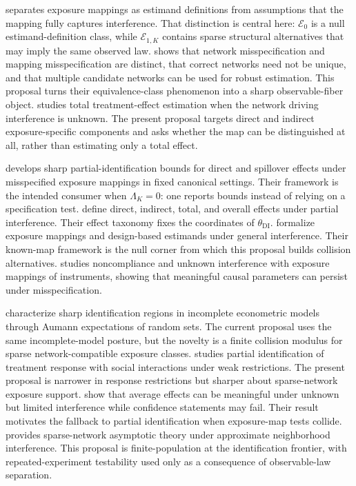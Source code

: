 \documentclass[11pt]{article}
\theoremstyle{definition}
\theoremstyle{plain}
\theoremstyle{remark}
\begin{document}
\citet{Savje2024} separates exposure mappings as estimand definitions from assumptions that the mapping fully captures interference.  That distinction is central here: \(\mathcal E_0\) is a null estimand-definition class, while \(\mathcal E_{1,K}\) contains sparse structural alternatives that may imply the same observed law.
\citet{WeinsteinNevo2026} shows that network misspecification and mapping misspecification are distinct, that correct networks need not be unique, and that multiple candidate networks can be used for robust estimation.  This proposal turns their equivalence-class phenomenon into a sharp observable-fiber object.
\citet{YuAiroldiBorgsChayes2022} studies total treatment-effect estimation when the network driving interference is unknown.  The present proposal targets direct and indirect exposure-specific components and asks whether the map can be distinguished at all, rather than estimating only a total effect.

\citet{SchroderOprescuFeuerriegelKallus2026} develops sharp partial-identification bounds for direct and spillover effects under misspecified exposure mappings in fixed canonical settings.  Their framework is the intended consumer when \(\Lambda_K=0\): one reports bounds instead of relying on a specification test.
\citet{HudgensHalloran2008} define direct, indirect, total, and overall effects under partial interference.  Their effect taxonomy fixes the coordinates of \(\theta_{\mathrm{DI}}\).
\citet{AronowSamii2017} formalize exposure mappings and design-based estimands under general interference.  Their known-map framework is the null corner from which this proposal builds collision alternatives.
\citet{HoshinoYanagi2024} studies noncompliance and unknown interference with exposure mappings of instruments, showing that meaningful causal parameters can persist under misspecification.

\citet{BeresteanuMolchanovMolinari2011} characterize sharp identification regions in incomplete econometric models through Aumann expectations of random sets.  The current proposal uses the same incomplete-model posture, but the novelty is a finite collision modulus for sparse network-compatible exposure classes.
\citet{Manski2013} studies partial identification of treatment response with social interactions under weak restrictions.  The present proposal is narrower in response restrictions but sharper about sparse-network exposure support.
\citet{SavjeAronowHudgens2021} show that average effects can be meaningful under unknown but limited interference while confidence statements may fail.  Their result motivates the fallback to partial identification when exposure-map tests collide.
\citet{Leung2022} provides sparse-network asymptotic theory under approximate neighborhood interference.  This proposal is finite-population at the identification frontier, with repeated-experiment testability used only as a consequence of observable-law separation.
\end{document}

